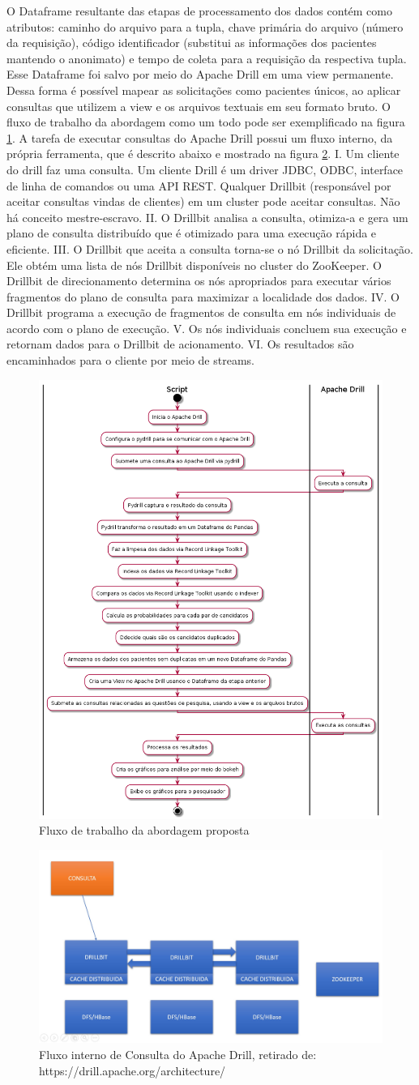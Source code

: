 O Dataframe resultante das etapas de processamento dos dados contém como atributos: caminho do arquivo para a tupla, chave primária do arquivo (número da requisição), código identificador (substitui as informações dos pacientes mantendo o anonimato) e tempo de coleta para a requisição da respectiva tupla.
Esse Dataframe foi salvo por meio do Apache Drill em uma view permanente.
Dessa forma é possível mapear as solicitações como pacientes únicos, ao aplicar consultas que utilizem a view e os arquivos textuais em seu formato bruto.
O fluxo de trabalho da abordagem como um todo pode ser exemplificado na figura \ref{fig4}. A tarefa de executar consultas do Apache Drill possui um fluxo interno, da própria ferramenta, que é descrito abaixo e mostrado na figura \ref{fig5}.
I. Um cliente do drill faz uma consulta. Um cliente Drill é um driver JDBC, ODBC, interface de linha de comandos ou uma API REST. Qualquer Drillbit (responsável por aceitar consultas vindas de clientes) em um cluster pode aceitar consultas. Não há conceito mestre-escravo.
II. O Drillbit analisa a consulta, otimiza-a e gera um plano de consulta distribuído que é otimizado para uma execução rápida e eficiente.
III. O Drillbit que aceita a consulta torna-se o nó Drillbit da solicitação. Ele obtém uma lista de nós Drillbit disponíveis no cluster do ZooKeeper. O Drillbit de direcionamento determina os nós apropriados para executar vários fragmentos do plano de consulta para maximizar a localidade dos dados.
IV. O Drillbit programa a execução de fragmentos de consulta em nós individuais de acordo com o plano de execução.
V. Os nós individuais concluem sua execução e retornam dados para o Drillbit de acionamento.
VI. Os resultados são encaminhados para o cliente por meio de streams.

\begin{figure}[!ht]
\centering
\includegraphics[width=0.3\linewidth]{figuras/wf_script.png}
\caption{Fluxo de trabalho da abordagem proposta}
\label{fig4}
\end{figure}

\begin{figure}[!ht]
\centering
\includegraphics[width=0.3\linewidth]{figuras/wf_drill.jpg}
\caption{Fluxo interno de Consulta do Apache Drill, retirado de: https://drill.apache.org/architecture/}
\label{fig5}
\end{figure}